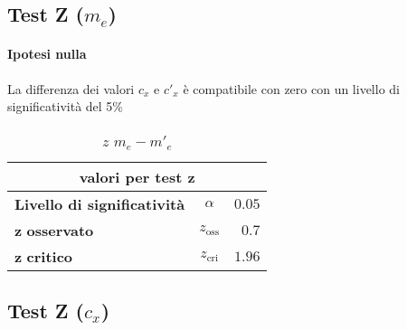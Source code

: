 \documentclass{article}
\begin{document}
	
	\vspace{0.4cm}
	\begin{center}
		\begin{minipage}{0.48\textwidth}
			\subsection{Test Z (\(m_{e}\))}
			\paragraph{Ipotesi nulla} La differenza dei valori \(c_{x}\) e \(c'_{x}\) è compatibile con zero con un livello di significatività del 5\%
			\begin{table}[H] \centering
				\begin{small}
					\begin{tabular}{@{}lcr@{}}\toprule
						\multicolumn{3}{c}{\textbf{valori per test} \(\boldsymbol{z}\)}\\ \midrule
						\textbf{Livello di significatività}		 &  \(\alpha\) &\(0.05\) \\  \hdashline
						\(\boldsymbol{z}\) \textbf{osservato}		& \(z_{\text{oss}}\)  &\(0.7\)\\ \hdashline
						\(\boldsymbol{z}\) \textbf{critico}		& \(z_{\text{cri}}\)  &\(1.96\)\\ 
						\bottomrule
					\end{tabular}
				\end{small}
				\caption{\(z\) \(m_{e} - m'_{e}\)}
			\end{table}
		\end{minipage}
		\hspace{0.3cm}
		\begin{minipage}{0.48\textwidth}
			\subsection{Test Z (\(c_{x}\))}

\end{minipage}
\end{center}
\end{document}
